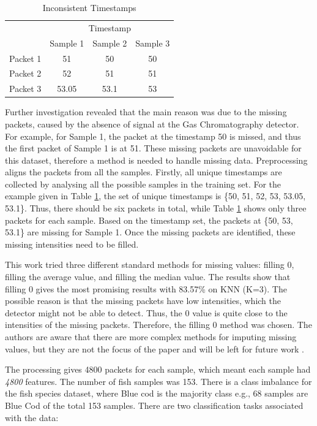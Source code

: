 \documentclass[runningheads]{llncs}
\begin{document}
\begin{table}[t]
	\centering
	\caption{Inconsistent Timestamps}
	\label{tb:badRaw}
\begin{tabular}{|l|c|c|c|}
	\hline
	& \multicolumn{3}{c|}{Timestamp} \\
	\cline{2-4}
	& Sample 1 & Sample 2 & Sample 3\\
	\hline 
	Packet 1 & 51 & 50 & 50 \\
	Packet 2 & 52 & 51 & 51\\
	Packet 3 & 53.05 & 53.1 & 53 \\
	\hline
\end{tabular}
\end{table}

Further investigation revealed that the main reason was due to the missing packets, caused by the absence of signal at the Gas Chromatography detector. 
For example, for Sample 1, the packet at the timestamp 50 is missed, and thus the first packet of Sample 1 is at 51. 
These missing packets are unavoidable for this dataset, therefore a method is needed to handle missing data. 
Preprocessing aligns the packets from all the samples.
Firstly, all unique timestamps are collected by analysing all the possible samples in the training set. 
For the example given in Table \ref{tb:badRaw}, the set of unique timestamps is \{50, 51, 52, 53, 53.05, 53.1\}. 
Thus, there should be six packets in total, while Table \ref{tb:badRaw} shows only three packets for each sample. 
Based on the timestamp set, the packets at \{50, 53, 53.1\} are missing for Sample 1. 
Once the missing packets are identified, these missing intensities need to be filled.

This work tried three different standard methods for missing values: filling 0, filling the average value, and filling the median value. 
The results show that filling 0 gives the most promising results with 83.57\% on KNN (K=3). 
The possible reason is that the missing packets have low intensities, which the detector might not be able to detect. 
Thus, the 0 value is quite close to the intensities of the missing packets. 
Therefore, the filling 0 method was chosen. 
The authors are aware that there are more complex methods for imputing missing values, but they are not the focus of the paper and will be left for future work \cite{tran2015multiple}.

The processing gives 4800 packets for each sample, which meant each sample had \textit{4800} features. 
The number of fish samples was 153. 
There is a class imbalance for the fish species dataset, where Blue cod is the majority class e.g., 68 samples are Blue Cod of the total 153 samples.
There are two classification tasks associated with the data:
\end{document}
